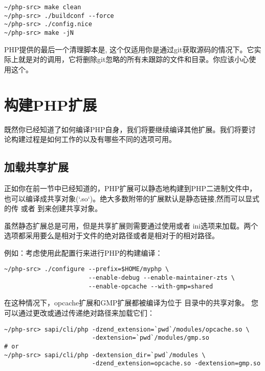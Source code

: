 \begin{lstlisting}[language=shell]
~/php-src> make clean
~/php-src> ./buildconf --force
~/php-src> ./config.nice
~/php-src> make -jN
\end{lstlisting}

PHP提供的最后一个清理脚本是, 这个仅适用你是通过git获取源码的情况下。它实际上就是对的调用，它将删除git忽略的所有未跟踪的文件和目录。你应该小心使用这个。

\section{构建PHP扩展}

\label{sec:building_extensions}

既然你已经知道了如何编译PHP自身，我们将要继续编译其他扩展。我们将要讨论构建过程是如何工作的以及有哪些不同的选项可用。

\subsection{加载共享扩展}

正如你在前一节中已经知道的，PHP扩展可以静态地构建到PHP二进制文件中，也可以编译成共享对象(`.so`)。绝大多数附带的扩展默认是静态链接,然而可以显式的传 或者 到来创建共享对象。

虽然静态扩展总是可用，但是共享扩展则需要通过使用或者 ini选项来加载。两个选项都采用要么是相对于文件的绝对路径或者是相对于的相对路径。

例如：考虑使用此配置行来进行PHP的构建编译：

\begin{lstlisting}[language=shell]
~/php-src> ./configure --prefix=$HOME/myphp \
                       --enable-debug --enable-maintainer-zts \
                       --enable-opcache --with-gmp=shared
\end{lstlisting}                   
                     

在这种情况下，opcache扩展和GMP扩展都被编译为位于 目录中的共享对象。 您可以通过更改或通过传递绝对路径来加载它们：

\begin{lstlisting}[language=shell]
~/php-src> sapi/cli/php -dzend_extension=`pwd`/modules/opcache.so \
                        -dextension=`pwd`/modules/gmp.so
# or
~/php-src> sapi/cli/php -dextension_dir=`pwd`/modules \
                        -dzend_extension=opcache.so -dextension=gmp.so
\end{lstlisting} 


